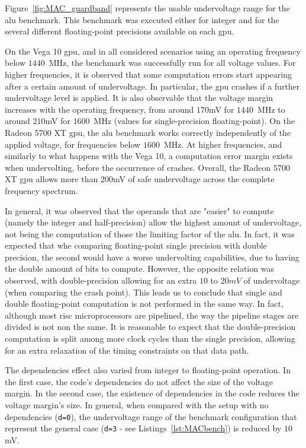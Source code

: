 \label{sec:cmac_guardband}

Figure~\ref{fig:MAC_guardband} represents the usable undervoltage range for the \acrshort{alu} benchmark. This benchmark was executed either for integer and for the several different floating-point precisions available on each \acrshort{gpu}. 

On the Vega 10 \acrshort{gpu}, and in all considered scenarios using an operating frequency below $1440$~MHz, the benchmark was successfully run for all voltage values. For higher frequencies, it is observed that some computation errors start appearing after a certain amount of undervoltage. In particular, the \acrshort{gpu} crashes if a further undervoltage level is applied. 
It is also observable that the voltage margin increases with the operating frequency, from around $170$mV for $1440$~MHz to around $210$mV for $1600$~MHz (values for single-precision floating-point). On the Radeon 5700 XT \acrshort{gpu}, the \acrshort{alu} benchmark works  correctly independently of the applied voltage, for frequencies below $1600$~MHz. At higher frequencies, and  similarly to what happens with the Vega 10, a computation error margin exists when undervolting, before the occurrence of crashes. Overall, the Radeon 5700 XT \acrshort{gpu} allows more than $200$mV of safe undervoltage across the complete frequency spectrum.

In general, it was observed that the operands that are "easier" to compute (namely the integer and half-precision) allow the highest amount of undervoltage, not being the computation of those the limiting factor of the \acrshort{alu}. 
In fact, it was expected that whe  comparing floating-point single precision with double precision, the second would have a worse undervolting capabilities, due to having the double amount of bits to compute. However, the opposite relation was observed, with double-precision allowing for an extra $10$ to $20mV$ of undervoltage (when comparing the crash point). This leads us to conclude that single and double floating-point computation is not performed in the same way. In fact, although most  \acrshort{risc} microprocessors are pipelined, the way the pipeline stages are divided is not non the same. It is reasonable to expect that the double-precision computation is split among more clock cycles than the single precision, allowing for an extra relaxation of the timing constraints on that data path.

The dependencies effect also varied from integer to floating-point operation. In the first case, the code's dependencies do not affect the size of the voltage margin. In the second case, the existence of dependencies in the code reduces the voltage margin's size. In general, when compared with the setup with no dependencies (\texttt{d=0}), the undervoltage range of the benchmark configuration that represent the general case (\texttt{d=3} - see Listings~\ref{lst:MACbench}) is reduced by $10$mV. 

